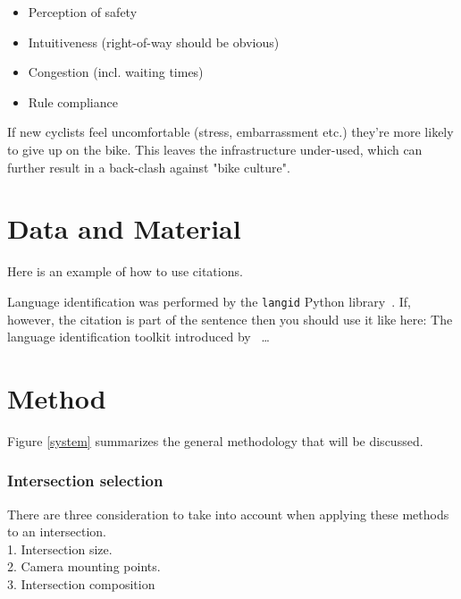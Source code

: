 \documentclass[
10pt, %
a4paper, %
oneside, %
headinclude,footinclude, %
] {book}%
\begin{document}
\begin{itemize}
	\item Perception of safety
	\item Intuitiveness (right-of-way should be obvious)
	\item Congestion (incl. waiting times)
	\item Rule compliance
\end{itemize}

If new cyclists feel uncomfortable (stress, embarrassment etc.) they're more likely to give up on the bike. This leaves the infrastructure 
under-used, which can further result in a back-clash against "bike culture".

\chapter{Data and Material}
\label{datagathering}

Here is an example of how to use citations.

Language identification was performed by the \texttt{langid} Python library~\citep{langid}. If, however, the citation is part of the sentence then you should use it like here: The language identification toolkit introduced by~\cite{langid}
\ldots

\chapter{Method}

Figure \ref{system} summarizes the general methodology that will be discussed.

\subsection{Intersection selection}
There are three consideration to take into account when applying these methods to an intersection.
\ \\
1. Intersection size.
\ \\
2. Camera mounting points.
\ \\
3. Intersection composition
\end{document}
